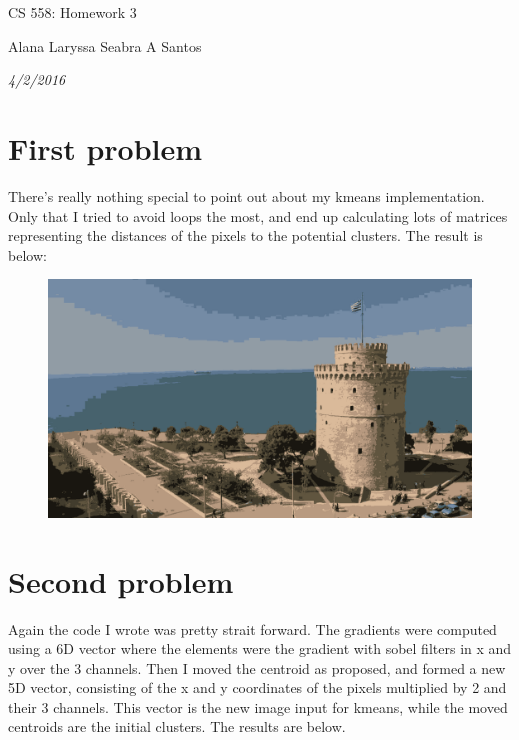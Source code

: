 \documentclass{article}
\begin{document}
\centerline{\sc \large CS 558: Homework 3}
\vspace{.5pc}
\centerline{Alana Laryssa Seabra A Santos}
\centerline{\it 4/2/2016}
\vspace{1pc}

\section{First problem}

There's really nothing special to point out about my kmeans implementation. Only that I tried to avoid loops the most, and end up calculating lots of matrices representing the distances of the pixels to the potential clusters. The result is below:

\begin{figure}[ht]
\centering
  \includegraphics[scale=0.3]{kmeans.png}
\end{figure}

\section{Second problem}

Again the code I wrote was pretty strait forward. The gradients were computed using a 6D vector where the elements were the gradient with sobel filters in x and y over the 3 channels. Then I moved the centroid as proposed, and formed a new 5D vector, consisting of the x and y coordinates of the pixels multiplied by 2 and their 3 channels. This vector is the new image input for kmeans, while the moved centroids are the initial clusters. The results are below.
\\ \\
\end{document}
